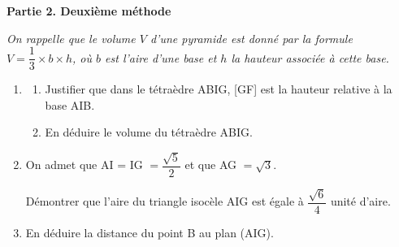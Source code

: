 \documentclass[10pt]{article}
\begin{document}
\bigskip

\textbf{Partie 2. Deuxième méthode}

\medskip

\emph{On rappelle que le volume $V$ d'une pyramide est donné par la formule $V = \dfrac{1}{3} \times  b \times h$, où $b$ est l'aire d'une base et $h$ la hauteur associée à cette base.}

\medskip

\begin{enumerate}
\item 
	\begin{enumerate}
		\item Justifier que dans le tétraèdre ABIG, [GF] est la hauteur relative à la base AIB. 
		\item En déduire le volume du tétraèdre ABIG.
	\end{enumerate}
\item On admet que AI = IG $= \dfrac{\sqrt{5}}{2}$ et que AG $= \sqrt 3$.

Démontrer que l'aire du triangle isocèle AIG est égale à $\dfrac{\sqrt{6}}{4}$ unité d'aire.
\item En déduire la distance du point B au plan (AIG).
\end{enumerate}
\end{document}
